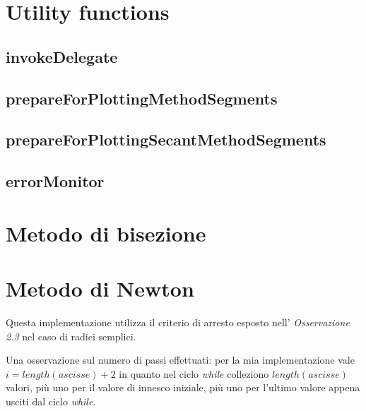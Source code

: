 \section{Utility functions}
\subsection{invokeDelegate}


\subsection{prepareForPlottingMethodSegments}


\subsection{prepareForPlottingSecantMethodSegments}


\subsection{errorMonitor}


\section{Metodo di bisezione}
\label{sec:bisectionIterativeMethod}


\section{Metodo di Newton}
\label{sec:newtonIterativeMethod}
Questa implementazione utilizza il criterio di arresto esposto nell'
\emph{Osservazione 2.3} nel caso di radici semplici.

Una osservazione sul numero di passi effettuati: per la mia implementazione
vale $i = length(ascisse) + 2$ in quanto nel ciclo \emph{while} colleziono
$length(ascisse)$ valori, pi\`u uno per il valore di innesco iniziale, pi\`u uno
per l'ultimo valore appena usciti dal ciclo \emph{while}.

